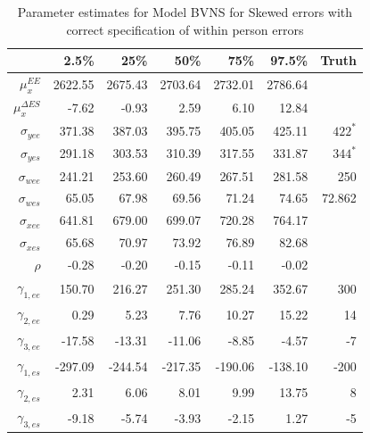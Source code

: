 \documentclass[11pt]{article}\usepackage[]{graphicx}\usepackage[]{color}
\begin{document}
\begin{table}[ht]
\centering
\begin{tabular}{rrrrrr|r}
  \hline
 & 2.5\% & 25\% & 50\% & 75\% & 97.5\% & Truth\\
  \hline
$\mu_x^{EE}$ & 2622.55 & 2675.43 & 2703.64 & 2732.01 & 2786.64 \\ 
  $\mu_x^{\Delta ES}$ & -7.62 & -0.93 & 2.59 & 6.10 & 12.84 \\ 
  $\sigma_{yee}$ & 371.38 & 387.03 & 395.75 & 405.05 & 425.11 & $422^*$ \\ 
  $\sigma_{yes}$ & 291.18 & 303.53 & 310.39 & 317.55 & 331.87 & $344^*$ \\ 
  $\sigma_{wee}$ & 241.21 & 253.60 & 260.49 & 267.51 & 281.58 & 250 \\ 
  $\sigma_{wes}$ & 65.05 & 67.98 & 69.56 & 71.24 & 74.65 & 72.862\\ 
  $\sigma_{xee}$ & 641.81 & 679.00 & 699.07 & 720.28 & 764.17 \\ 
  $\sigma_{xes}$ & 65.68 & 70.97 & 73.92 & 76.89 & 82.68 \\ 
  $\rho$ & -0.28 & -0.20 & -0.15 & -0.11 & -0.02 \\ 
  $\gamma_{1,ee}$ & 150.70 & 216.27 & 251.30 & 285.24 & 352.67 & 300 \\ 
  $\gamma_{2,ee}$ & 0.29 & 5.23 & 7.76 & 10.27 & 15.22 & 14\\ 
  $\gamma_{3,ee}$ & -17.58 & -13.31 & -11.06 & -8.85 & -4.57 & -7 \\ 
  $\gamma_{1,es}$ & -297.09 & -244.54 & -217.35 & -190.06 & -138.10 & -200 \\ 
  $\gamma_{2,es}$ & 2.31 & 6.06 & 8.01 & 9.99 & 13.75 & 8\\ 
  $\gamma_{3,es}$ & -9.18 & -5.74 & -3.93 & -2.15 & 1.27 & -5 \\ 
   \hline
\end{tabular}
\caption{Parameter estimates for Model BVNS for Skewed errors with correct specification of within person errors}
\label{mbvnswpestimates}
\end{table}
\end{document}
